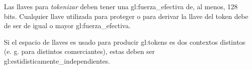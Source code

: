 {
  Las llaves para \textit{tokenizar} deben tener una
  \gls{gl:fuerza_efectiva} de, al menos, 128 bits. Cualquier llave utilizada
  para proteger o para derivar la llave del token debe de ser de igual o
  mayor \gls{gl:fuerza_efectiva}.
}

{
  Si el espacio de llaves es usado para producir \glspl{gl:token} es dos
  contextos distintos (e. g. para distintos comerciantes), estas deben ser
  \glspl{gl:estidisticamente_independiente}.
}
